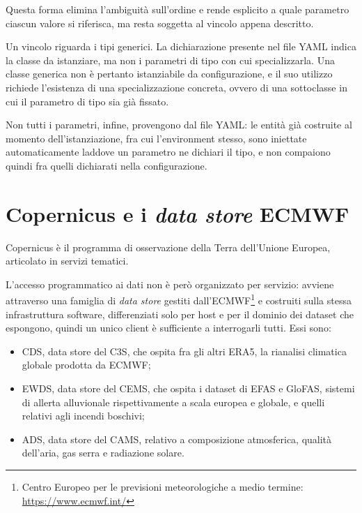 Questa forma elimina l'ambiguità sull'ordine e rende esplicito a quale parametro ciascun
valore si riferisca, ma resta soggetta al vincolo appena descritto.

Un vincolo riguarda i tipi generici. La dichiarazione presente nel file YAML indica
la classe da istanziare, ma non i parametri di tipo con cui specializzarla.
Una classe generica non è pertanto istanziabile da
configurazione, e il suo utilizzo richiede l'esistenza di una specializzazione concreta,
ovvero di una sottoclasse in cui il parametro di tipo sia già fissato.

Non tutti i parametri, infine, provengono dal file YAML: le entità già costruite al momento
dell'istanziazione, fra cui l'environment stesso, sono iniettate automaticamente laddove un
parametro ne dichiari il tipo, e non compaiono quindi fra quelli dichiarati nella
configurazione.

\section{Copernicus e i \emph{data store} ECMWF}
\label{sec:copernicus}

Copernicus è il programma di osservazione della Terra dell'Unione Europea, articolato in
servizi tematici. 

L'accesso programmatico ai dati non è però organizzato per servizio: avviene attraverso
una famiglia di \emph{data store} gestiti dall'\ac{ECMWF}\footnote{Centro Europeo per le previsioni meteorologiche a medio termine: \url{https://www.ecmwf.int/}}
e costruiti sulla stessa
infrastruttura software, differenziati solo per host e per il dominio dei dataset che
espongono, quindi un unico client è sufficiente a interrogarli tutti. Essi sono:

\begin{itemize}
    \item \ac{CDS}, data store del \ac{C3S}, che ospita fra gli altri ERA5, la
    rianalisi climatica globale prodotta da \ac{ECMWF};
    \item \ac{EWDS}, data store del \ac{CEMS}, che ospita i dataset di \ac{EFAS} e
    \ac{GloFAS}, sistemi di allerta alluvionale rispettivamente a scala europea e
    globale, e quelli relativi agli incendi boschivi;
    \item \ac{ADS}, data store del \ac{CAMS}, relativo a composizione atmosferica,
    qualità dell'aria, gas serra e radiazione solare.
\end{itemize}


